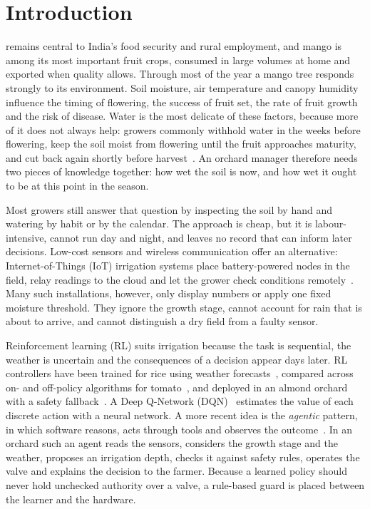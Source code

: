 \documentclass[conference]{IEEEtran}
\begin{document}
\section{Introduction}
 remains central to India's food security and rural employment, and mango is among its most important fruit crops, consumed in large volumes at home and exported when quality allows. Through most of the year a mango tree responds strongly to its environment. Soil moisture, air temperature and canopy humidity influence the timing of flowering, the success of fruit set, the rate of fruit growth and the risk of disease. Water is the most delicate of these factors, because more of it does not always help: growers commonly withhold water in the weeks before flowering, keep the soil moist from flowering until the fruit approaches maturity, and cut back again shortly before harvest~\cite{ntdaf,wfp}. An orchard manager therefore needs two pieces of knowledge together: how wet the soil is now, and how wet it ought to be at this point in the season.

Most growers still answer that question by inspecting the soil by hand and watering by habit or by the calendar. The approach is cheap, but it is labour-intensive, cannot run day and night, and leaves no record that can inform later decisions. Low-cost sensors and wireless communication offer an alternative: Internet-of-Things (IoT) irrigation systems place battery-powered nodes in the field, relay readings to the cloud and let the grower check conditions remotely~\cite{garcia2020,goap2018}. Many such installations, however, only display numbers or apply one fixed moisture threshold. They ignore the growth stage, cannot account for rain that is about to arrive, and cannot distinguish a dry field from a faulty sensor.

Reinforcement learning (RL) suits irrigation because the task is sequential, the weather is uncertain and the consequences of a decision appear days later. RL controllers have been trained for rice using weather forecasts~\cite{chen2021}, compared across on- and off-policy algorithms for tomato~\cite{alibabaei2022}, and deployed in an almond orchard with a safety fallback~\cite{ding2022}. A Deep Q-Network (DQN)~\cite{mnih2015} estimates the value of each discrete action with a neural network. A more recent idea is the \emph{agentic} pattern, in which software reasons, acts through tools and observes the outcome~\cite{yao2023}. In an orchard such an agent reads the sensors, considers the growth stage and the weather, proposes an irrigation depth, checks it against safety rules, operates the valve and explains the decision to the farmer. Because a learned policy should never hold unchecked authority over a valve, a rule-based guard is placed between the learner and the hardware.
\end{document}
